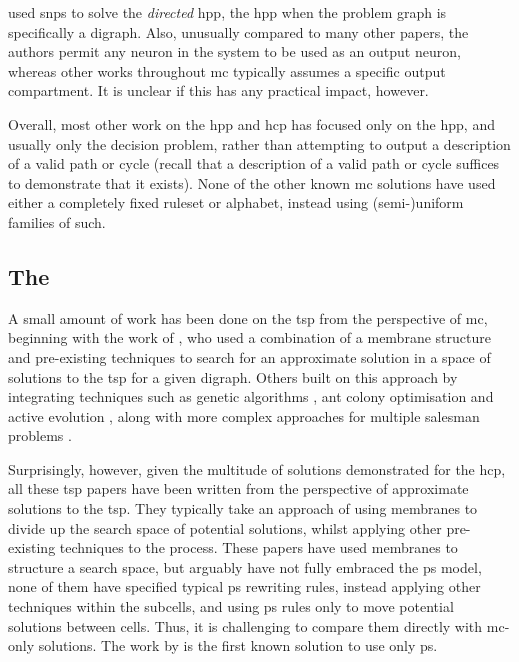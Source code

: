 
\citeauthor{Xue2013} \cite{Xue2013} used \gls{snps} to solve the \emph{directed} \gls{hpp}, \ie{} the \gls{hpp} when the problem graph is specifically a digraph.  Also, unusually compared to many other papers, the authors permit any neuron in the system to be used as an output neuron, whereas other works throughout \gls{mc} typically assumes a specific output \gls{compartment}.  It is unclear if this has any practical impact, however.


Overall, most other work on the \gls{hpp} and \gls{hcp} has focused only on the \gls{hpp}, and usually only the decision problem, rather than attempting to output a description of a valid path or cycle (recall that a description of a valid path or cycle suffices to demonstrate that it exists).  None of the other known \gls{mc} solutions have used either a completely fixed \gls{ruleset} or alphabet, instead using (semi-)uniform families of such.


\subsection{The }

A small amount of work has been done on the \gls{tsp} from the perspective of \gls{mc}, beginning with the work of \citeauthor{Nishida2006} \cite{Nishida2006}, who used a combination of a membrane structure and pre-existing techniques to search for an approximate solution in a space of solutions to the \gls{tsp} for a given digraph.  Others built on this approach by integrating techniques such as genetic algorithms \cite{Manalastas2013,He2014}, ant colony optimisation \cite{Zhang2011} and active evolution \cite{Song2015}, along with more complex approaches for multiple salesman problems \cite{He2015}.

Surprisingly, however, given the multitude of solutions demonstrated for the \gls{hcp}, all these \gls{tsp} papers have been written from the perspective of approximate solutions to the \gls{tsp}.  They typically take an approach of using membranes to divide up the search space of potential solutions, whilst applying other pre-existing techniques to the process.  These papers have used membranes to structure a search space, but arguably have not fully embraced the \gls{ps} model, \eg{} none of them have specified typical \gls{ps} rewriting rules, instead applying other techniques within the subcells, and using \gls{ps} rules only to move potential solutions between cells.  Thus, it is challenging to compare them directly with \gls{mc}-only solutions.  The work by \citeauthor{Guo2017} \cite{Guo2017} is the first known solution to use only \gls{ps}.

